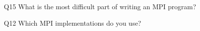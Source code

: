 \begin{description}%
\item{Q15} What is the most difficult part of writing an MPI program?%
\item{Q12} Which MPI implementations do you use?%
\end{description}%
